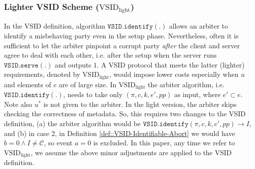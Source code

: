 \begin{definition}
\begin{enumerate}
\end{enumerate}
\end{definition}


\subsubsection{Lighter VSID Scheme ($\text{VSID}_{\scriptscriptstyle\text{light}}$)}\label{remark::light-VSID}
In the VSID  definition, algorithm  $\mathtt{VSID.identify}(.)$    allows an arbiter  to identify a misbehaving party even in the setup phase. Nevertheless, often it is sufficient  to let the arbiter pinpoint a corrupt party \emph{after} the client and server agree to deal with each other, i.e. after the setup when the server runs  $\mathtt{VSID.serve}(.)$ and outputs $1$. A VSID protocol that meets the latter (lighter) requirements, denoted by $\text{VSID}_{\scriptscriptstyle \text{light}}$, would impose lower costs  especially when $u$ and elements of $e$ are of large size. In $\text{VSID}_{\scriptscriptstyle\text{light}}$  the arbiter algorithm, i.e. $\mathtt{VSID.identify}(.)$, needs to take only $(\pi, c, k, e',{pp})$ as input, where $e'\subset e$. Note also $u^{\scriptscriptstyle *}$ is not given to the arbiter. In the light version, the arbiter   skips  checking the correctness of metadata. So, this requires two changes to the VSID definition, (a) the arbiter algorithm would be   $\mathtt{VSID.identify}(\pi,c,k,e',{pp})\rightarrow I$, and (b) in case 2, in Definition \ref{def::VSID-Identifiable-Abort} we would have $b=0\wedge I\neq \mathcal C$, so event $a=0$ is excluded. In this paper, any time we refer to $\text{VSID}_{\scriptscriptstyle\text{light}}$, we assume the above minor adjustments are applied to the VSID definition. 









